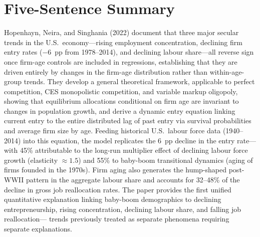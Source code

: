 \section*{Five-Sentence Summary}

Hopenhayn, Neira, and Singhania (2022) document that three major secular
trends in the U.S.\ economy---rising employment concentration, declining firm
entry rates ($-6$~pp from 1978--2014), and declining labour share---all
reverse sign once firm-age controls are included in regressions, establishing
that they are driven entirely by changes in the firm-age distribution rather
than within-age-group trends. They develop a general theoretical framework,
applicable to perfect competition, CES monopolistic competition, and variable
markup oligopoly, showing that equilibrium allocations conditional on firm age
are invariant to changes in population growth, and derive a dynamic entry
equation linking current entry to the entire distributed lag of past entry via
survival probabilities and average firm size by age. Feeding historical U.S.\
labour force data (1940--2014) into this equation, the model replicates the
6~pp decline in the entry rate---with 45\% attributable to the long-run
multiplier effect of declining labour force growth (elasticity $\approx 1.5$)
and 55\% to baby-boom transitional dynamics (aging of firms founded in the
1970s). Firm aging also generates the hump-shaped post-WWII pattern in the
aggregate labour share and accounts for 32--48\% of the decline in gross job
reallocation rates. The paper provides the first unified quantitative
explanation linking baby-boom demographics to declining entrepreneurship,
rising concentration, declining labour share, and falling job reallocation---
trends previously treated as separate phenomena requiring separate explanations.

